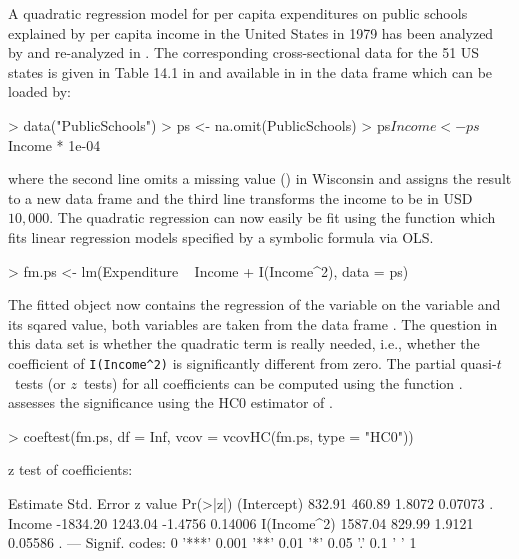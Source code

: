 \documentclass{Z}
\begin{document}
A quadratic regression model for per capita expenditures on public schools
explained by per capita income in the United States in 1979
has been analyzed by \cite{hac:Greene:1993} and re-analyzed in
\cite{hac:Cribari-Neto:2004}. The corresponding cross-sectional
data for the 51 US states
is given in Table 14.1 in \cite{hac:Greene:1993} and available in
 in the data frame  which can be
loaded by:
\begin{Schunk}
\begin{Sinput}
> data("PublicSchools")
> ps <- na.omit(PublicSchools)
> ps$Income <- ps$Income * 1e-04
\end{Sinput}
\end{Schunk}
where the second line omits a missing value () in Wisconsin
and assigns the result to a new data frame  and
the third line transforms the income to be in USD $10,000$.
The quadratic regression can now easily be fit using the function
 which fits linear regression models specified by
a symbolic formula via OLS.
\begin{Schunk}
\begin{Sinput}
> fm.ps <- lm(Expenditure ~ Income + I(Income^2), data = ps)
\end{Sinput}
\end{Schunk}
The fitted  object  now contains the regression of
the variable  on the variable 
and its sqared value, both variables are taken from the data frame .
The question in this data set is whether the quadratic term is really 
needed, i.e., whether the coefficient of \verb/I(Income^2)/ is significantly
different from zero. The partial quasi-$t$~tests (or $z$~tests) for all
coefficients can be computed using the function . \cite{hac:Greene:1993}
assesses the significance using the HC0 estimator of \cite{hac:White:1980}.
\begin{Schunk}
\begin{Sinput}
> coeftest(fm.ps, df = Inf, vcov = vcovHC(fm.ps, type = "HC0"))
\end{Sinput}
\begin{Soutput}
z test of coefficients:

            Estimate Std. Error z value Pr(>|z|)  
(Intercept)   832.91     460.89  1.8072  0.07073 .
Income      -1834.20    1243.04 -1.4756  0.14006  
I(Income^2)  1587.04     829.99  1.9121  0.05586 .
---
Signif. codes:  0 '***' 0.001 '**' 0.01 '*' 0.05 '.' 0.1 ' ' 1 
\end{Soutput}
\end{Schunk}
\end{document}
